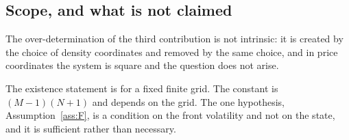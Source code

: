 \subsection*{Scope, and what is not claimed}

The over-determination of the third contribution is not intrinsic: it is created
by the choice of density coordinates and removed by the same choice, and in
price coordinates the system is square and the question does not arise.

The existence statement is for a fixed finite grid. The constant is
$(M-1)(N+1)$ and depends on the grid. The one
hypothesis, Assumption~\ref{ass:F}, is a condition on the front volatility and
not on the state, and it is sufficient rather than necessary.
